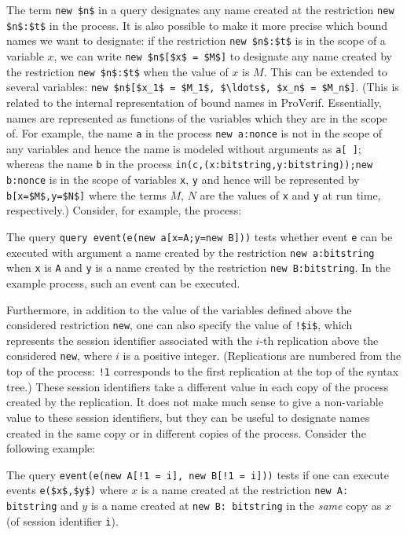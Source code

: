 \documentclass{book}
\begin{document}
The term \lstinline!new $n$! in a query designates any name created at
the restriction \lstinline!new $n$:$t$! in the process. It is also
possible to make it more precise which bound names we want to
designate: if the restriction \lstinline!new $n$:$t$! is in the scope
of a variable $x$, we can write \lstinline!new $n$[$x$ = $M$]! to designate
any name created by the restriction \lstinline!new $n$:$t$! when the value
of $x$ is $M$. This can be extended to several variables:
\lstinline!new $n$[$x_1$ = $M_1$, $\ldots$, $x_n$ = $M_n$]!.
%
(This is related to the internal representation of bound names in
ProVerif.  Essentially, names are represented as functions of the
variables which they are in the scope of. For example, the name
\lstinline!a! in the process \lstinline!new a:nonce! is not in the
scope of any variables and hence the name is modeled without arguments
as \lstinline!a[ ]!; whereas the name \lstinline!b! in the process
\lstinline!in(c,(x:bitstring,y:bitstring));new b:nonce! is in the
scope of variables \lstinline!x!, \lstinline!y! and hence will be
represented by \lstinline!b[x=$M$,y=$N$]! where the terms $M$, $N$ are
the values of \lstinline!x! and \lstinline!y! at run time,
respectively.)
%
Consider, for example, the process:
%

%
The query \lstinline!query event(e(new a[x=A;y=new B]))! tests whether
event \lstinline!e! can be executed with argument a name created by
the restriction \lstinline!new a:bitstring! when \lstinline!x! is
\lstinline!A! and \lstinline!y! is a name created by the restriction
\lstinline!new B:bitstring!. In the example process, such an event can
be executed.

Furthermore, in addition to the value of the variables defined above
the considered restriction \lstinline!new!, one can also specify the
value of \lstinline{!$i$}, which represents the session identifier
associated with the $i$-th replication above the considered
\lstinline!new!, where $i$ is a positive integer. (Replications are
numbered from the top of the process: \lstinline{!1} corresponds to the
first replication at the top of the syntax tree.) These session
identifiers take a different value in each copy of the process created
by the replication. It does not make much sense to give a non-variable
value to these session identifiers, but they can be useful to
designate names created in the same copy or in different copies of the
process. Consider the following example:
%

%
The query \lstinline{event(e(new A[!1 = i], new B[!1 = i]))} tests if
one can execute events \lstinline{e($x$,$y$)} where $x$ is a name
created at the restriction \lstinline!new A: bitstring! and $y$ is a
name created at \lstinline!new B: bitstring!  in the
\emph{same} copy as $x$ (of session identifier \lstinline!i!).
\end{document}
